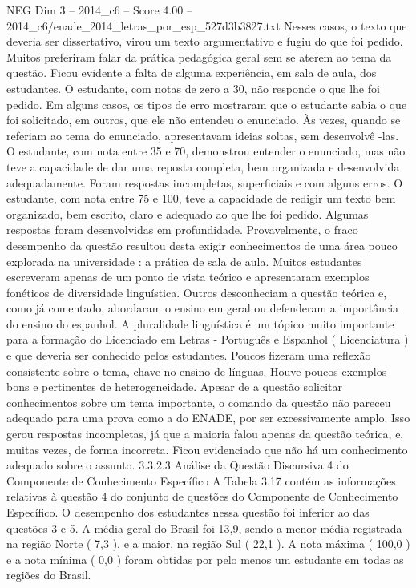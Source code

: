 \begin{textsample}{NEG Dim 3 – 2014\_c6 – Score 4.00 – 2014\_c6/enade\_2014\_letras\_por\_esp\_527d3b3827.txt}
Nesses casos, o texto que deveria ser dissertativo, virou um texto argumentativo e fugiu do que foi pedido.
Muitos preferiram falar da prática pedagógica geral sem se aterem ao tema da questão.
Ficou evidente a falta de alguma experiência, em sala de aula, dos estudantes.
O estudante, com notas de zero a 30, não responde o que lhe foi pedido.
Em alguns casos, os tipos de erro mostraram que o estudante sabia o que foi solicitado, em outros, que ele não entendeu o enunciado.
Às vezes, quando se referiam ao tema do enunciado, apresentavam ideias soltas, sem desenvolvê -las.
O estudante, com nota entre 35 e 70, demonstrou entender o enunciado, mas não teve a capacidade de dar uma reposta completa, bem organizada e desenvolvida adequadamente.
Foram respostas incompletas, superficiais e com alguns erros.
O estudante, com nota entre 75 e 100, teve a capacidade de redigir um texto bem organizado, bem escrito, claro e adequado ao que lhe foi pedido.
Algumas respostas foram desenvolvidas em profundidade.
Provavelmente, o fraco desempenho da questão resultou desta exigir conhecimentos de uma área pouco explorada na universidade : a prática de sala de aula.
Muitos estudantes escreveram apenas de um ponto de vista teórico e apresentaram exemplos fonéticos de diversidade linguística.
Outros desconheciam a questão teórica e, como já comentado, abordaram o ensino em geral ou defenderam a importância do ensino do espanhol.
A pluralidade linguística é um tópico muito importante para a formação do Licenciado em Letras - Português e Espanhol ( Licenciatura ) e que deveria ser conhecido pelos estudantes.
Poucos fizeram uma reflexão consistente sobre o tema, chave no ensino de línguas.
Houve poucos exemplos bons e pertinentes de heterogeneidade.
Apesar de a questão solicitar conhecimentos sobre um tema importante, o comando da questão não pareceu adequado para uma prova como a do ENADE, por ser excessivamente amplo.
Isso gerou respostas incompletas, já que a maioria falou apenas da questão teórica, e, muitas vezes, de forma incorreta.
Ficou evidenciado que não há um conhecimento adequado sobre o assunto. 3.3.2.3 Análise da Questão Discursiva 4 do Componente de Conhecimento Específico A Tabela 3.17 contém as informações relativas à questão 4 do conjunto de questões do Componente de Conhecimento Específico.
O desempenho dos estudantes nessa questão foi inferior ao das questões 3 e 5.
A média geral do Brasil foi 13,9, sendo a menor média registrada na região Norte ( 7,3 ), e a maior, na região Sul ( 22,1 ).
A nota máxima ( 100,0 ) e a nota mínima ( 0,0 ) foram obtidas por pelo menos um estudante em todas as regiões do Brasil.

\end{textsample}
